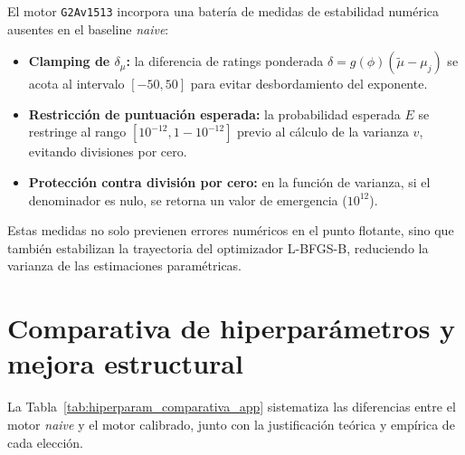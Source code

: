 El motor \texttt{G2Av1513} incorpora una bater\'ia de medidas de estabilidad num\'erica ausentes en el baseline \textit{naive}:
\begin{itemize}
	\item \textbf{Clamping de $\delta_\mu$:} la diferencia de ratings ponderada $\delta = g(\phi)(\tilde{\mu} - \mu_j)$ se acota al intervalo $[-50, 50]$ para evitar desbordamiento del exponente.
	\item \textbf{Restricci\'on de puntuaci\'on esperada:} la probabilidad esperada $E$ se restringe al rango $[10^{-12}, 1-10^{-12}]$ previo al c\'alculo de la varianza $v$, evitando divisiones por cero.
	\item \textbf{Protecci\'on contra divisi\'on por cero:} en la funci\'on de varianza, si el denominador es nulo, se retorna un valor de emergencia ($10^{12}$).
\end{itemize}

Estas medidas no solo previenen errores num\'ericos en el punto flotante, sino que tambi\'en estabilizan la trayectoria del optimizador L-BFGS-B, reduciendo la varianza de las estimaciones param\'etricas.


\section{Comparativa de hiperpar\'ametros y mejora estructural}

La Tabla~\ref{tab:hiperparam_comparativa_app} sistematiza las diferencias entre el motor \textit{naive} y el motor calibrado, junto con la justificaci\'on te\'orica y emp\'irica de cada elecci\'on.

